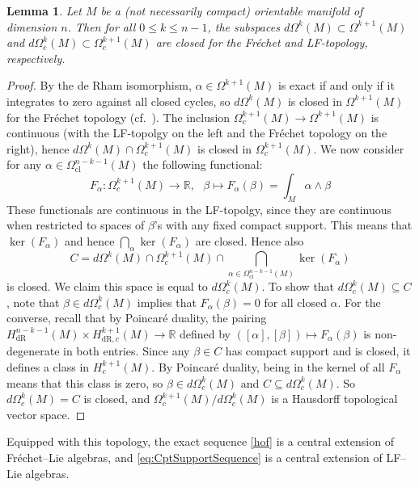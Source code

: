 \documentclass{article}
\newcommand{\dR}{\mathrm{dR}}
\newcommand{\cl}{\mathrm{cl}}
\newtheorem{Lemma}[Theorem]{Lemma}
\theoremstyle{definition}
\begin{document}
\begin{Lemma}\label{exareclosed}
Let $M$ be a (not necessarily compact) orientable manifold of dimension $n$. Then for all $0\leq k\leq n-1$, the subspaces
$d\Omega^{k}(M)\subset \Omega^{k+1}(M)$ and 
$d\Omega^{k}_c(M)\subset \Omega^{k+1}_c(M)$ are closed for the Fr\'echet and LF-topology, respectively. 
\end{Lemma}
\begin{proof}
By the de Rham isomorphism, $\alpha \in \Omega^{k+1}(M)$ is exact if and only if it integrates to zero against all closed cycles,
so $d\Omega^k(M)$ is closed in $\Omega^{k+1}(M)$ for the Fr\'echet topology (cf.\ \cite[Prop.\ 5.2]{DiezJanssensNeebVizman2021}).
The inclusion $\Omega^{k+1}_c(M)\to \Omega^{k+1}(M)$ is continuous (with the LF-topolgy on the left and the Fréchet topology on the right), hence $d\Omega^{k}(M)\cap \Omega^{k+1}_c(M)$ is closed in $ \Omega^{k+1}_c(M)$. We now consider for any $\alpha\in \Omega_{\cl}^{n-k-1}(M)$ the following functional:
$$
F_\alpha:\Omega^{k+1}_c(M)\to \mathbb R,~~~ \beta\mapsto F_\alpha(\beta)=\int_{M}\alpha\wedge \beta
$$
These functionals are continuous in the LF-topolgy, since they are continuous when restricted to spaces of $\beta$'s with any fixed compact support. This means that $\ker(F_\alpha)$ and hence $\bigcap_\alpha \ker(F_\alpha)$ are closed. Hence also 
 $$ C=d\Omega^{k}(M)\cap \Omega^{k+1}_c(M)\cap \bigcap_{\alpha\in \Omega_{\cl}^{n-k-1}(M)} \ker(F_\alpha)$$
is closed. We claim this space is equal to $d\Omega^{k}_c(M)$. 
To show that $d\Omega^{k}_{c}(M) \subseteq C$, note that $\beta\in d\Omega^{k}_c(M)$ implies that $F_\alpha(\beta)=0$ for all closed $\alpha$.
For the converse, recall that by Poincaré duality, the pairing 
$H^{n-k-1}_{\dR}(M)\times H^{k+1}_{\dR, c}(M)\to \mathbb R$ defined by $([\alpha],[\beta])\mapsto F_\alpha(\beta)$ is non-degenerate in both entries. Since any $\beta\in C$ has compact support and is closed, it defines a class in $H^{k+1}_c(M)$. By Poincaré duality, being in the kernel of all $F_\alpha$ means that this class is zero, so $\beta\in d\Omega^{k}_c(M)$ and  $C \subseteq d\Omega^{k}_c(M)$. So $d\Omega^{k}_c(M) = C$ is closed, and $\Omega^{k+1}_{c}(M)/d\Omega^{k}_{c}(M)$ is a Hausdorff topological vector space.
\end{proof}

Equipped with this topology, the exact sequence \eqref{hof} is a central extension of Fr\'echet--Lie algebras, and 
\eqref{eq:CptSupportSequence} is a central extension of LF--Lie algebras.
\end{document}
